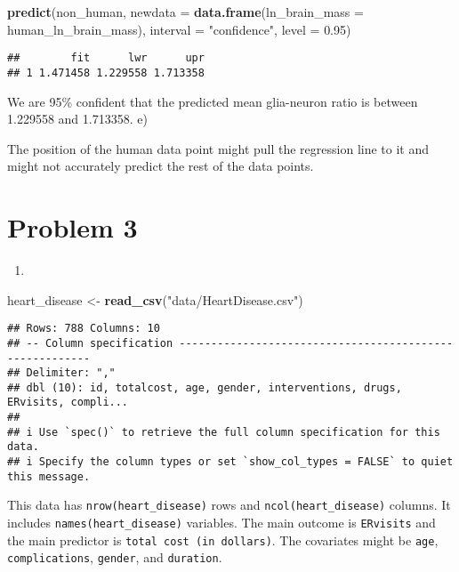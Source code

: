 \documentclass[
]{article}
\newenvironment{Shaded}{\begin{snugshade}}{\end{snugshade}}
\newcommand{\AttributeTok}[1]{\textcolor[rgb]{0.13,0.29,0.53}{#1}}
\newcommand{\FloatTok}[1]{\textcolor[rgb]{0.00,0.00,0.81}{#1}}
\newcommand{\FunctionTok}[1]{\textcolor[rgb]{0.13,0.29,0.53}{\textbf{#1}}}
\newcommand{\NormalTok}[1]{#1}
\newcommand{\OtherTok}[1]{\textcolor[rgb]{0.56,0.35,0.01}{#1}}
\newcommand{\StringTok}[1]{\textcolor[rgb]{0.31,0.60,0.02}{#1}}
\providecommand{\tightlist}{%
  \setlength{\itemsep}{0pt}\setlength{\parskip}{0pt}}
\begin{document}
\begin{Shaded}
\begin{Highlighting}[]
\FunctionTok{predict}\NormalTok{(non\_human, }\AttributeTok{newdata =} \FunctionTok{data.frame}\NormalTok{(}\AttributeTok{ln\_brain\_mass =}\NormalTok{ human\_ln\_brain\_mass), }\AttributeTok{interval =} \StringTok{"confidence"}\NormalTok{, }\AttributeTok{level =} \FloatTok{0.95}\NormalTok{)}
\end{Highlighting}
\end{Shaded}

\begin{verbatim}
##        fit      lwr      upr
## 1 1.471458 1.229558 1.713358
\end{verbatim}

We are 95\% confident that the predicted mean glia-neuron ratio is
between 1.229558 and 1.713358. e)

The position of the human data point might pull the regression line to
it and might not accurately predict the rest of the data points.

\section{Problem 3}\label{problem-3}

\begin{enumerate}
\def\labelenumi{\alph{enumi})}
\tightlist
\item
\end{enumerate}

\begin{Shaded}
\begin{Highlighting}[]
\NormalTok{heart\_disease }\OtherTok{\textless{}{-}} \FunctionTok{read\_csv}\NormalTok{(}\StringTok{"data/HeartDisease.csv"}\NormalTok{) }
\end{Highlighting}
\end{Shaded}

\begin{verbatim}
## Rows: 788 Columns: 10
## -- Column specification --------------------------------------------------------
## Delimiter: ","
## dbl (10): id, totalcost, age, gender, interventions, drugs, ERvisits, compli...
## 
## i Use `spec()` to retrieve the full column specification for this data.
## i Specify the column types or set `show_col_types = FALSE` to quiet this message.
\end{verbatim}

This data has \texttt{nrow(heart\_disease)} rows and
\texttt{ncol(heart\_disease)} columns. It includes
\texttt{names(heart\_disease)} variables. The main outcome is
\texttt{ERvisits} and the main predictor is
\texttt{total\ cost\ (in\ dollars)}. The covariates might be
\texttt{age}, \texttt{complications}, \texttt{gender}, and
\texttt{duration}.
\end{document}
